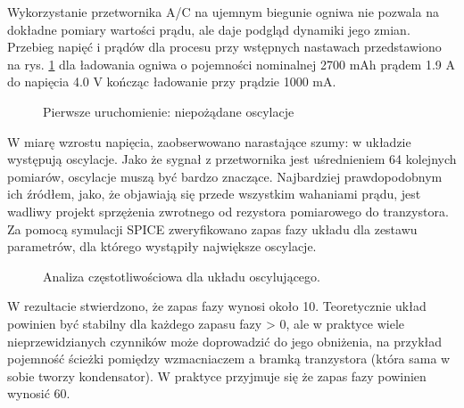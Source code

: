 \documentclass[polish,engineer]{polsl-msth}
\begin{document}
Wykorzystanie przetwornika A/C na ujemnym biegunie ogniwa nie pozwala na dokładne pomiary wartości prądu, ale daje podgląd dynamiki jego zmian. Przebieg napięć i prądów dla procesu przy wstępnych nastawach przedstawiono na rys. \ref{img:1strun} dla ładowania ogniwa o pojemności nominalnej 2700 mAh prądem 1.9 A do napięcia 4.0 V kończąc ładowanie przy prądzie 1000 mA. 

\begin{figure}[hbtp]
     \caption{Pierwsze uruchomienie: niepożądane oscylacje \label{img:1strun}}
\end{figure}
W miarę wzrostu napięcia, zaobserwowano narastające szumy: w układzie występują oscylacje. Jako że sygnał z przetwornika jest uśrednieniem 64 kolejnych pomiarów, oscylacje muszą być bardzo znaczące.
Najbardziej prawdopodobnym ich źródłem, jako, że objawiają się przede wszystkim wahaniami prądu, jest wadliwy projekt sprzężenia zwrotnego od rezystora pomiarowego do tranzystora. Za pomocą symulacji SPICE zweryfikowano zapas fazy układu dla zestawu parametrów, dla którego wystąpiły największe oscylacje.
\begin{figure}[hbtp]
     \caption{Analiza częstotliwościowa dla układu oscylującego. \label{img:bode_nocap}}
\end{figure}
W rezultacie stwierdzono, że zapas fazy wynosi około 10\degree. Teoretycznie układ powinien być stabilny dla każdego zapasu fazy > 0\degree, ale w praktyce wiele nieprzewidzianych czynników może doprowadzić do jego obniżenia, na przykład pojemność ścieżki pomiędzy wzmacniaczem a bramką tranzystora (która sama w sobie tworzy kondensator). W praktyce przyjmuje się że zapas fazy powinien wynosić 60\degree \cite{PhaseMargin_TERRELL1996383}.
\end{document}
